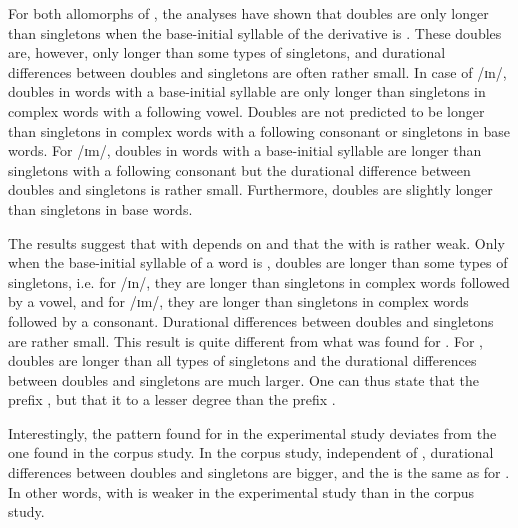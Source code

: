 For both allomorphs of , the analyses have shown that doubles are only longer than singletons when the base-initial syllable of the derivative is . These doubles are, however, only longer than some types of singletons, and durational differences between doubles and singletons are often rather small. 
In case of /ɪn/, doubles in words with a  base-initial syllable are only longer than singletons in complex words with a following vowel. Doubles are not predicted to be longer than singletons in complex words with a following consonant or singletons in base words. 
For /ɪm/, doubles in words with a  base-initial syllable are longer than singletons with a following consonant but the durational difference between doubles and singletons is rather small.
Furthermore, doubles are slightly longer than singletons in base words.


The results suggest that  with  depends on  and that the  with  is rather weak. Only when the base-initial syllable of a word is , doubles are longer than some types of singletons, i.e. for /ɪn/, they are longer than singletons in complex words followed by a vowel, and for /ɪm/, they are longer than singletons in complex words followed by a consonant. Durational differences between doubles and singletons are rather small. This result is quite different from what was found for . For , doubles are longer than all types of singletons and the durational differences between doubles and singletons are much larger. One can thus state that the prefix  , but that it  to a lesser degree than the prefix .

Interestingly, the  pattern found for  in the experimental study deviates from the one found in the corpus study. In the corpus study,   independent of , durational differences between doubles and singletons are bigger, and the  is the same as for . In other words,  with  is weaker in the experimental study than in the corpus study.

